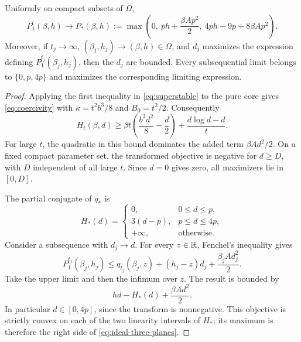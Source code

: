 \begin{lemma}\label{lem:initial-transform}
Uniformly on compact subsets of \(\Omega\),
\begin{equation}\label{eq:ideal-three-planes}
 P_1^t(\beta,h)\longrightarrow
 P_*(\beta,h)
 :=\max\left(0,\ ph+\frac{\beta Ap^2}{2},\
                     4ph-9p+8\beta Ap^2\right).
\end{equation}
Moreover, if \(t_j\to\infty\), \((\beta_j,h_j)\to(\beta,h)\in\Omega\),
and \(d_j\) maximizes the expression defining
\(P_1^{t_j}(\beta_j,h_j)\), then the \(d_j\) are bounded.
Every subsequential limit belongs to \(\{0,p,4p\}\) and maximizes
the corresponding limiting expression.
\end{lemma}

\begin{proof}
Applying the first inequality in \eqref{eq:superstable} to the
pure core gives \eqref{eq:coercivity} with
\(\kappa=t^2b^3/8\) and \(B_0=t^2/2\).  Consequently
\[
 H_t(\beta,d)
 \ge \beta t\left(\frac{b^3d^2}{8}-\frac d2\right)
                       +\frac{d\log d-d}{t}.
\]
For large \(t\), the quadratic in this bound dominates the added term
\(\beta Ad^2/2\).  On a fixed compact parameter set, the transformed
objective is negative for \(d\ge D\), with \(D\) independent of all
large \(t\).  Since \(d=0\) gives zero, all maximizers lie in \([0,D]\).

The partial conjugate of \(q_*\) is
\[
 H_*(d)=
 \begin{cases}
  0,&0\le d\le p,\\
  3(d-p),&p\le d\le4p,\\
  +\infty,&\text{otherwise}.
 \end{cases}
\]
Consider a subsequence with \(d_j\to d\).
For every \(z\in\mathbb R\), Fenchel's inequality gives
\[
 P_1^{t_j}(\beta_j,h_j)
 \le q_{t_j}(\beta_j,z)+(h_j-z)d_j
                                      +\frac{\beta_jAd_j^2}{2}.
\]
Take the upper limit and then the infimum over \(z\).
The result is bounded by
\[
 hd-H_*(d)+\frac{\beta Ad^2}{2}.
\]
In particular \(d\in[0,4p]\), since the transform is nonnegative.
This objective is strictly convex on each of the two linearity
intervals of \(H_*\); its maximum is therefore the right side of
\eqref{eq:ideal-three-planes}.


\end{proof}
